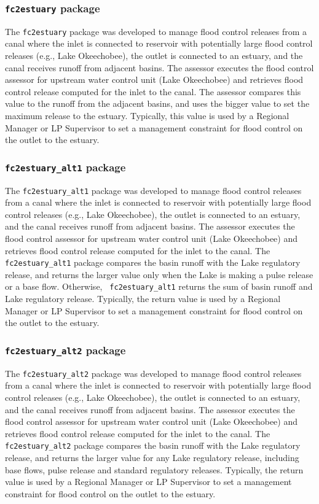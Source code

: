 \subsubsection{{\tt fc2estuary} package}

The {\tt fc2estuary} package was developed to manage flood control
releases from a canal where the inlet is connected to reservoir with
potentially large flood control releases (e.g., Lake Okeechobee), the
outlet is connected to an estuary, and the canal receives runoff from
adjacent basins.  The assessor executes the flood control assessor for
upstream water control unit (Lake Okeechobee) and retrieves flood
control release computed for the inlet to the canal.  The assessor
compares this value to the runoff from the adjacent basins, and uses
the bigger value to set the maximum release to the estuary.
Typically, this value is used by a Regional Manager or LP Supervisor
to set a management constraint for flood control on the outlet to the
estuary.


\subsubsection{{\tt fc2estuary\_alt1} package}

The {\tt fc2estuary\_alt1} package was developed to manage flood
control releases from a canal where the inlet is connected to
reservoir with potentially large flood control releases (e.g., Lake
Okeechobee), the outlet is connected to an estuary, and the canal
receives runoff from adjacent basins.  The assessor executes the flood
control assessor for upstream water control unit (Lake Okeechobee) and
retrieves flood control release computed for the inlet to the canal.
The {\tt fc2estuary\_alt1} package compares the basin runoff with the
Lake regulatory release, and returns the larger value only when the
Lake is making a pulse release or a base flow.  Otherwise, {\tt
  fc2estuary\_alt1} returns the sum of basin runoff and Lake
regulatory release.  Typically, the return value is used by a Regional
Manager or LP Supervisor to set a management constraint for flood
control on the outlet to the estuary.  

\subsubsection{{\tt fc2estuary\_alt2} package}

The {\tt fc2estuary\_alt2} package was developed to manage flood
control releases from a canal where the inlet is connected to
reservoir with potentially large flood control releases (e.g., Lake
Okeechobee), the outlet is connected to an estuary, and the canal
receives runoff from adjacent basins.  The assessor executes the flood
control assessor for upstream water control unit (Lake Okeechobee) and
retrieves flood control release computed for the inlet to the canal.
The {\tt fc2estuary\_alt2} package compares the basin runoff with the
Lake regulatory release, and returns the larger value for any Lake
regulatory release, including base flows, pulse release and standard
regulatory releases.  Typically, the return value is used by a
Regional Manager or LP Supervisor to set a management constraint for
flood control on the outlet to the estuary.  
